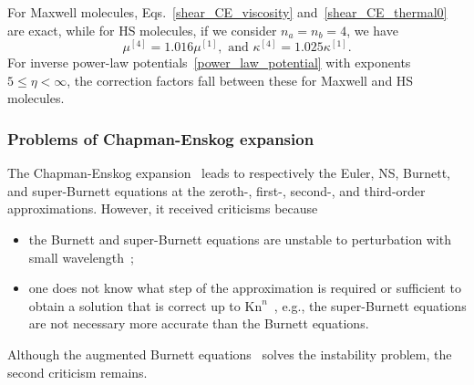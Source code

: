 For Maxwell molecules, Eqs.~\eqref{shear_CE_viscosity} and~\eqref{shear_CE_thermal0} are exact, while for HS molecules, if we consider $n_a=n_b=4$, we have
\begin{equation}\label{transport_high_oder}
\mu^{[4]}=1.016\mu^{[1]}, 
\text{~and~}
\kappa^{[4]}=1.025\kappa^{[1]}.
\end{equation}
For inverse power-law potentials~\eqref{power_law_potential} with exponents $5\le\eta<\infty$, the correction factors fall between these for Maxwell and HS molecules.




\subsubsection{Problems of Chapman-Enskog expansion}

The Chapman-Enskog expansion~\cite{CE} leads to respectively the Euler, NS, Burnett, and super-Burnett equations at the zeroth-, first-, second-, and third-order approximations. 
However, it received criticisms because
\begin{itemize}
	\item the Burnett and super-Burnett equations are unstable to perturbation with small wavelength~\cite{Bobylev2006,Colin2008};
	
	\item one does not know what step of the approximation is required or sufficient to obtain a solution that is correct up to  $\text{Kn}^n$~\cite{Cercignanibook1988,Sone2002Book}, e.g., the super-Burnett equations are not necessary more accurate than the Burnett equations.
	
\end{itemize} 

Although the augmented Burnett equations~\cite{Zhong1993} solves the instability problem, the second criticism remains. %




